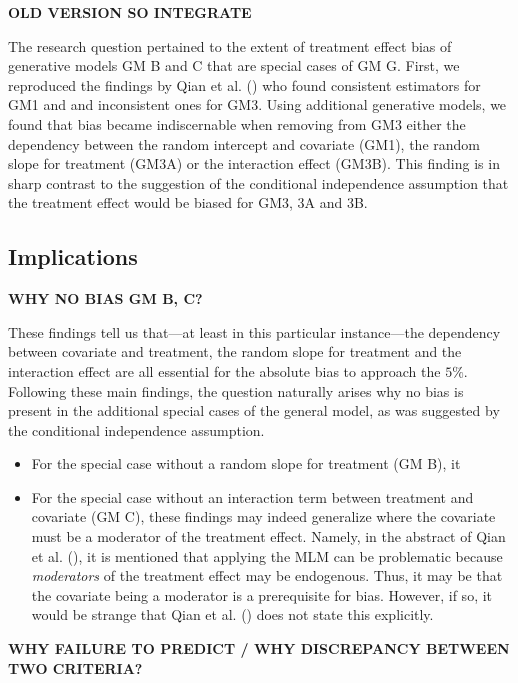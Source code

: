 \documentclass[
  11pt,
  a4paper,
]{article}
\begin{document}
\textbf{OLD VERSION SO INTEGRATE}

The research question pertained to the extent of treatment effect bias
of generative models GM B and C that are special cases of GM G. First,
we reproduced the findings by Qian et al.
() who found consistent estimators for GM1
and and inconsistent ones for GM3. Using additional generative models,
we found that bias became indiscernable when removing from GM3 either
the dependency between the random intercept and covariate (GM1), the
random slope for treatment (GM3A) or the interaction effect (GM3B). This
finding is in sharp contrast to the suggestion of the conditional
independence assumption that the treatment effect would be biased for
GM3, 3A and 3B.

\subsection{Implications}\label{implications}

\textbf{WHY NO BIAS GM B, C?}

These findings tell us that---at least in this particular instance---the
dependency between covariate and treatment, the random slope for
treatment and the interaction effect are all essential for the absolute
bias to approach the \(5\%\). Following these main findings, the
question naturally arises why no bias is present in the additional
special cases of the general model, as was suggested by the conditional
independence assumption.

\begin{itemize}
\item
  For the special case without a random slope for treatment (GM B), it
\item
  For the special case without an interaction term between treatment and
  covariate (GM C), these findings may indeed generalize where the
  covariate must be a moderator of the treatment effect. Namely, in the
  abstract of Qian et al. (), it is
  mentioned that applying the MLM can be problematic because
  \emph{moderators} of the treatment effect may be endogenous. Thus, it
  may be that the covariate being a moderator is a prerequisite for
  bias. However, if so, it would be strange that Qian et al.
  () does not state this explicitly.
\end{itemize}

\textbf{WHY FAILURE TO PREDICT / WHY DISCREPANCY BETWEEN TWO CRITERIA?}
\end{document}
